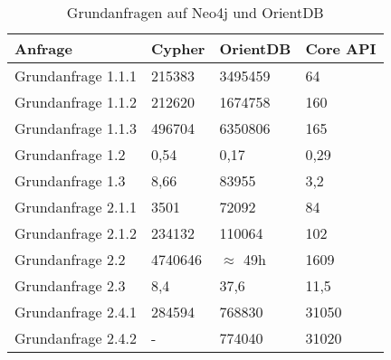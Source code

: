 \begin{table}[h]
	\centering
	\begin{tabular}{ |p{6cm}||p{2cm}|p{2cm}|p{2cm}|  }
		\hline
		Anfrage& Cypher & OrientDB & Core API \\
		\hline
	Grundanfrage 1.1.1  & 215383 & 3495459    &  64\\
	Grundanfrage 1.1.2& 212620 & 1674758   & 160   \\
	Grundanfrage 1.1.3& 496704 & 6350806 & 165  \\
	Grundanfrage 1.2& 0,54 & 0,17   & 0,29   \\
	Grundanfrage 1.3 & 8,66& 83955  & 3,2    \\
	Grundanfrage 2.1.1& 3501 & 72092   & 84   \\
	Grundanfrage 2.1.2& 234132& 110064  & 102    \\
	Grundanfrage 2.2& 4740646 &  $\approx$ 49h   & 1609  \\
	Grundanfrage 2.3& 8,4  & 37,6   & 11,5   \\
	Grundanfrage 2.4.1& 284594 & 768830  & 31050\\
	Grundanfrage 2.4.2& -  & 774040   & 31020   \\
		\hline
	\end{tabular}
	\caption{Grundanfragen auf Neo4j und OrientDB}
	\label{tab:Query3}
\end{table}
\FloatBarrier
